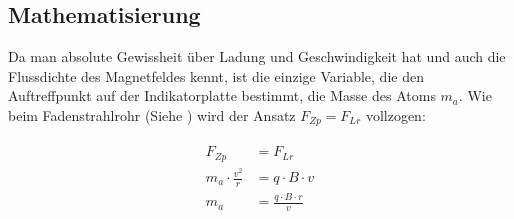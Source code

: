 \subsection{Mathematisierung}

Da man absolute Gewissheit über Ladung und Geschwindigkeit hat und auch die Flussdichte des Magnetfeldes kennt, ist die einzige Variable, die den Auftreffpunkt auf der Indikatorplatte bestimmt, die Masse des Atoms $m_a$. Wie beim Fadenstrahlrohr (Siehe ) wird der Ansatz $F_{Zp} = F_{Lr}$ vollzogen:

\begin{align}
\begin{split}
	F_{Zp} 				  	&= F_{Lr} \\
	m_a \cdot \frac{v^2}{r} &= q \cdot B \cdot v \\
	m_a 					&= \frac{q \cdot B \cdot r}{v}
\end{split}
\end{align}










